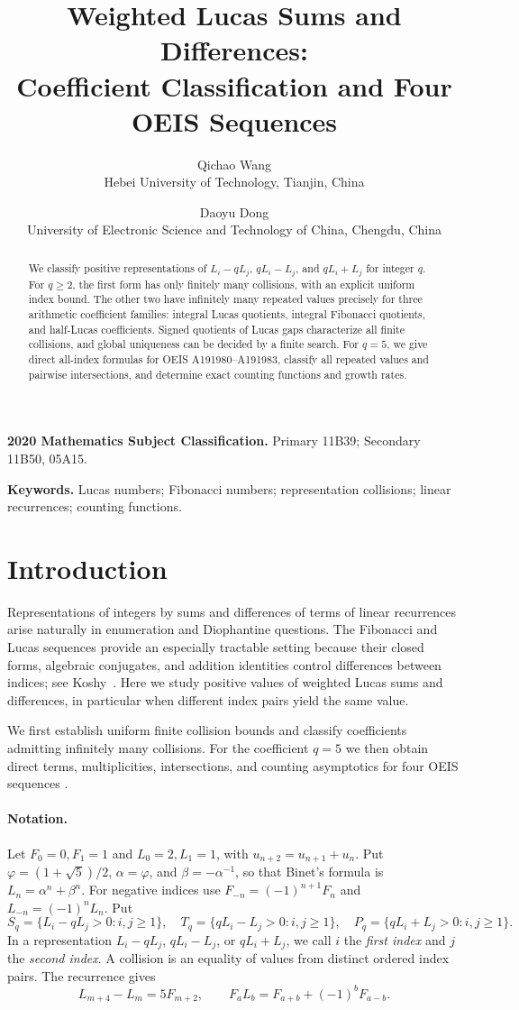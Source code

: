 \documentclass[11pt]{article}
\title{Weighted Lucas Sums and Differences:\\
Coefficient Classification and Four OEIS Sequences}
\author{Qichao Wang\\{\small Hebei University of Technology, Tianjin, China}\and Daoyu Dong\\{\small University of Electronic Science and Technology of China, Chengdu, China}}
\date{}
\begin{document}
\maketitle
\begin{abstract}
We classify positive representations of \(L_i-qL_j\),
\(qL_i-L_j\), and \(qL_i+L_j\) for integer \(q\).
For \(q\ge2\), the first form has only finitely
many collisions, with an explicit uniform index bound.
The other two have infinitely many repeated values
precisely for three arithmetic coefficient families:
integral Lucas quotients, integral Fibonacci quotients,
and half-Lucas coefficients. Signed quotients of Lucas
gaps characterize all finite collisions, and
global uniqueness can be decided by a finite search.
For \(q=5\), we give direct all-index formulas for
OEIS A191980--A191983, classify all repeated values
and pairwise intersections, and determine exact counting
functions and growth rates.
\end{abstract}
\noindent\textbf{2020 Mathematics Subject Classification.} Primary 11B39; Secondary 11B50, 05A15.
\par\smallskip
\noindent\textbf{Keywords.} Lucas numbers; Fibonacci numbers; representation collisions; linear recurrences; counting functions.

\section{Introduction}
Representations of integers by sums and differences of terms of linear
recurrences arise naturally in enumeration and Diophantine questions.
The Fibonacci and Lucas sequences provide an especially tractable
setting because their closed forms, algebraic conjugates, and
addition identities control differences between indices;
see Koshy~\cite{koshy}.
Here we study positive values of weighted Lucas sums and
differences, in particular when different index pairs yield the same value.

We first establish uniform finite collision bounds and classify
coefficients admitting infinitely many collisions. For the coefficient
$q=5$ we then obtain direct terms, multiplicities, intersections,
and counting asymptotics for four OEIS sequences
\cite{oeis980,oeis981,oeis982,oeis983}.

\paragraph{Notation.}
Let $F_0=0,F_1=1$ and $L_0=2,L_1=1$, with $u_{n+2}=u_{n+1}+u_n$.
Put $\varphi=(1+\sqrt5)/2$, $\alpha=\varphi$, and $\beta=-\alpha^{-1}$, so that Binet's formula is $L_n=\alpha^n+\beta^n$. For negative indices use $F_{-n}=(-1)^{n+1}F_n$ and $L_{-n}=(-1)^nL_n$. Put
\[
S_q=\{L_i-qL_j>0:i,j\ge1\},\quad
T_q=\{qL_i-L_j>0:i,j\ge1\},\quad
P_q=\{qL_i+L_j>0:i,j\ge1\}.
\]
In a representation $L_i-qL_j$, $qL_i-L_j$, or $qL_i+L_j$, we call $i$ the \emph{first index} and $j$ the \emph{second index}. A collision is an equality of values from distinct ordered index pairs.
The recurrence gives
\begin{equation}\label{eq:identities}
L_{m+4}-L_m=5F_{m+2},\qquad
F_aL_b=F_{a+b}+(-1)^bF_{a-b}.
\end{equation}
\end{document}
